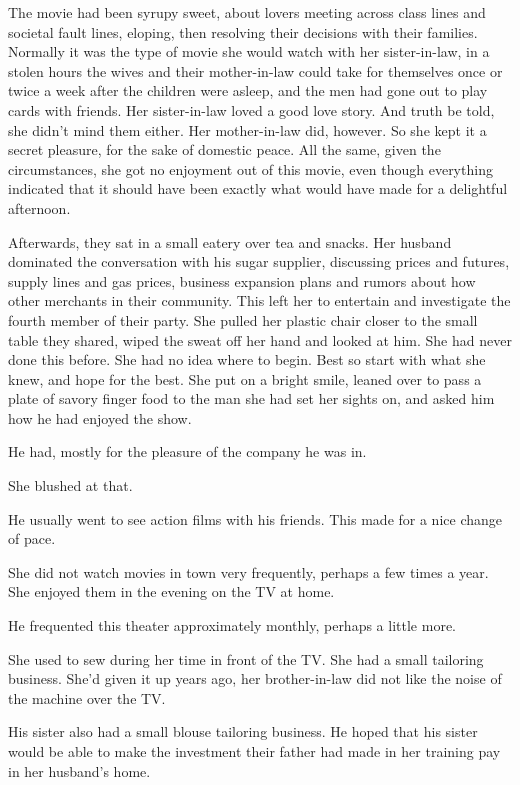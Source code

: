 \documentclass{article}
\begin{document}
The movie had been syrupy sweet, about lovers meeting across class lines and societal fault lines, eloping, then resolving their decisions with their families. Normally it was the type of movie she would watch with her sister-in-law, in a stolen hours the wives and their mother-in-law could take for themselves once or twice a week after the children were asleep, and the men had gone out to play cards with friends. Her sister-in-law loved a good love story. And truth be told, she didn't mind them either. Her mother-in-law did, however. So she kept it a secret pleasure, for the sake of domestic peace. All the same, given the circumstances, she got no enjoyment out of this movie, even though everything indicated that it should have been exactly what would have made for a delightful afternoon.

Afterwards, they sat in a small eatery over tea and snacks. Her husband dominated the conversation with his sugar supplier, discussing prices and futures, supply lines and gas prices, business expansion plans and rumors about how other merchants in their community. This left her to entertain and investigate the fourth member of their party. She pulled her plastic chair closer to the small table they shared, wiped the sweat off her hand and looked at him. She had never done this before. She had no idea where to begin. Best so start with what she knew, and hope for the best. She put on a bright smile, leaned over to pass a plate of savory finger food to the man she had set her sights on, and asked him how he had enjoyed the show.

He had, mostly for the pleasure of the company he was in. 

She blushed at that.

He usually went to see action films with his friends. This made for a nice change of pace.

She did not watch movies in town very frequently, perhaps a few times a year. She enjoyed them in the evening on the TV at home. 

He frequented this theater approximately monthly, perhaps a little more. 

She used to sew during her time in front of the TV. She had a small tailoring business. She'd given it up years ago, her brother-in-law did not like the noise of the machine over the TV.

His sister also had a small blouse tailoring business. He hoped that his sister would be able to make the investment their father had made in her training pay in her husband's home.
\end{document}
